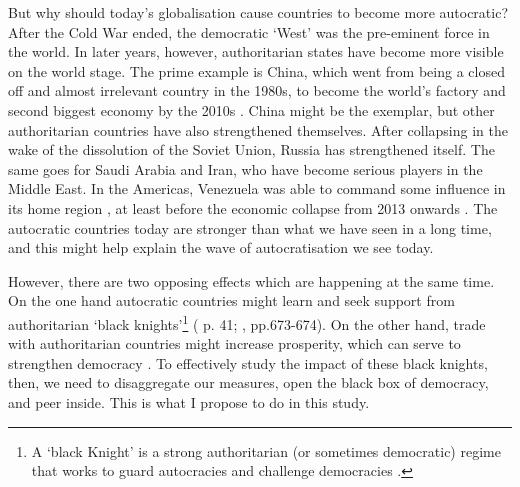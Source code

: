 But why should today's globalisation cause countries to become more autocratic? After the Cold War ended, the democratic `West' was the pre-eminent force in the world. In later years, however, authoritarian states have become more visible on the world stage. The prime example is China, which went from being a closed off and almost irrelevant country in the 1980s, to become the world's factory and second biggest economy by the 2010s \citep{imf_world_2025}. China might be the exemplar, but other authoritarian countries have also strengthened themselves. After collapsing in the wake of the dissolution of the Soviet Union, Russia has strengthened itself. The same goes for Saudi Arabia and Iran, who have become serious players in the Middle East. In the Americas, Venezuela was able to command some influence in its home region \citep[p. 204]{mcconnell_elite_2024}, at least before the economic collapse from 2013 onwards \citep{imf_world_2025}. The autocratic countries today are stronger than what we have seen in a long time, and this might help explain the wave of autocratisation we see today.

However, there are two opposing effects which are happening at the same time. On the one hand autocratic countries might learn and seek support from authoritarian `black knights'\footnote{A `black Knight' is a strong authoritarian (or sometimes democratic) regime that works to guard autocracies and challenge democracies \cite[p. 676]{tolstrup_black_2014}.} (\citeauthor{levitsky_competitive_2010} \citeyear{levitsky_competitive_2010} p. 41; \citeauthor{tolstrup_black_2014} \citeyear{tolstrup_black_2014}, pp.673-674). On the other hand, trade with authoritarian countries might increase prosperity, which can serve to strengthen democracy \citep{lipset_social_1959, przeworski_modernization_1997}. To effectively study the impact of these black knights, then, we need to disaggregate our measures, open the black box of democracy, and peer inside. This is what I propose to do in this study.

